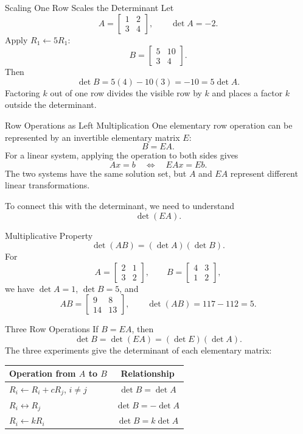 \begin{frame}{Scaling One Row Scales the Determinant}
Let
\[
A=\begin{bmatrix}1&2\\3&4\end{bmatrix},
\qquad \det A=-2.
\]
Apply $R_1\leftarrow5R_1$:
\[
B=\begin{bmatrix}5&10\\3&4\end{bmatrix}.
\]
Then
\[
\det B=5(4)-10(3)=-10=5\det A.
\]
\pause
Factoring $k$ out of one row divides the visible row by $k$ and places a factor $k$ outside the determinant.
\end{frame}

\begin{frame}{Row Operations as Left Multiplication}
One elementary row operation can be represented by an invertible elementary matrix $E$:
\[
B=EA.
\]
\pause
For a linear system, applying the operation to both sides gives
\[
Ax=b
\quad\Longleftrightarrow\quad
EAx=Eb.
\]
The two systems have the same solution set, but $A$ and $EA$ represent different linear transformations.
\pause

To connect this with the determinant, we need to understand
\[
\det(EA).
\]
\end{frame}

\begin{frame}{Multiplicative Property}
\[
\boxed{\det(AB)=(\det A)(\det B)}.
\]
\pause
For
\[
A=\begin{bmatrix}2&1\\3&2\end{bmatrix},
\qquad
B=\begin{bmatrix}4&3\\1&2\end{bmatrix},
\]
we have $\det A=1$, $\det B=5$, and
\[
AB=\begin{bmatrix}9&8\\14&13\end{bmatrix},
\qquad
\det(AB)=117-112=5.
\]
\end{frame}

\begin{frame}{Three Row Operations}
If $B=EA$, then
\[
\det B=\det(EA)=(\det E)(\det A).
\]
\pause
The three experiments give the determinant of each elementary matrix:
\renewcommand{\arraystretch}{1.35}
\begin{center}
\begin{tabular}{>{\raggedright\arraybackslash}p{.48\linewidth}c}
\toprule
Operation from $A$ to $B$ & Relationship \\
\midrule
$R_i\leftarrow R_i+cR_j$, $i\ne j$ & $\det B=\det A$ \\
$R_i\leftrightarrow R_j$ & $\det B=-\det A$ \\
$R_i\leftarrow kR_i$ & $\det B=k\det A$ \\
\bottomrule
\end{tabular}
\end{center}
\end{frame}

